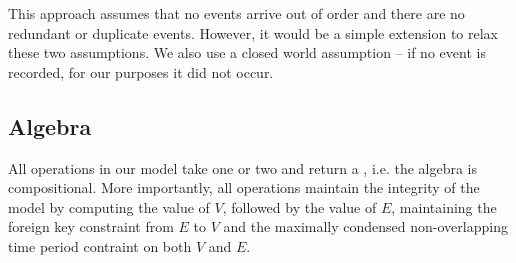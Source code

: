 This approach assumes that no events arrive out of order and there are
no redundant or duplicate events.  However, it would be a simple
extension to relax these two assumptions.  We also use a closed world
assumption -- if no event is recorded, for our purposes it did not
occur.

\subsection{Algebra}
\label{sec:model:algebra}

All operations in our model take one or two \tgs and return a \tg,
i.e. the algebra is compositional.  More importantly, all operations
maintain the integrity of the model by computing the value of $V$,
followed by the value of $E$, maintaining the foreign key constraint
from $E$ to $V$ and the maximally condensed non-overlapping time
period contraint on both $V$ and $E$.
